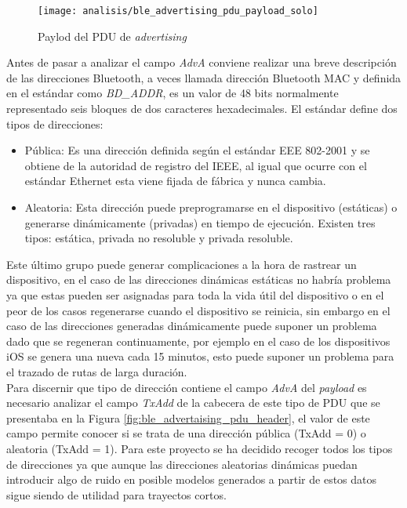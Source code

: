 \documentclass[../proyecto.tex]{subfiles}
\begin{document}
\begin{figure}[H]
\centering
\texttt{[image: analisis/ble\_advertising\_pdu\_payload\_solo]}
\caption{Paylod del PDU de \textit{advertising}}
\label{fig:ble_advertising_pdu_payload_solo}
\end{figure}

Antes de pasar a analizar el campo \textit{AdvA} conviene realizar una breve descripción de las direcciones Bluetooth, a veces llamada dirección Bluetooth MAC y definida en el estándar como \textit{BD\_ADDR}, es un valor de 48 bits normalmente representado seis bloques de dos caracteres hexadecimales. El estándar define dos tipos de direcciones:

\begin{itemize}
  \item Pública: Es una dirección definida según el estándar EEE 802-2001 y se obtiene de la autoridad de registro del IEEE, al igual que ocurre con el estándar Ethernet esta viene fijada de fábrica y nunca cambia.
  \item Aleatoria: Esta dirección puede preprogramarse en el dispositivo (estáticas) o generarse dinámicamente (privadas) en tiempo de ejecución. Existen tres tipos: estática, privada no resoluble y privada resoluble.
\end{itemize}

Este último grupo puede generar complicaciones a la hora de rastrear un dispositivo, en el caso de las direcciones dinámicas estáticas no habría problema ya que estas pueden ser asignadas para toda la vida útil del dispositivo o en el peor de los casos regenerarse cuando el dispositivo se reinicia, sin embargo en el caso de las direcciones generadas dinámicamente puede suponer un problema dado que se regeneran continuamente, por ejemplo en el caso de los dispositivos iOS se genera una nueva cada 15 minutos, esto puede suponer un problema para el trazado de rutas de larga duración.\\

Para discernir que tipo de dirección contiene el campo \textit{AdvA} del \textit{payload} es necesario analizar el campo \textit{TxAdd} de la cabecera de este tipo de PDU que se presentaba en la Figura \ref{fig:ble_advertaising_pdu_header}, el valor de este campo permite conocer si se trata de una dirección pública (TxAdd = 0) o aleatoria (TxAdd = 1). Para este proyecto se ha decidido recoger todos los tipos de direcciones ya que aunque las direcciones aleatorias dinámicas puedan introducir algo de ruido en posible modelos generados a partir de estos datos sigue siendo de utilidad para trayectos cortos.
\end{document}
